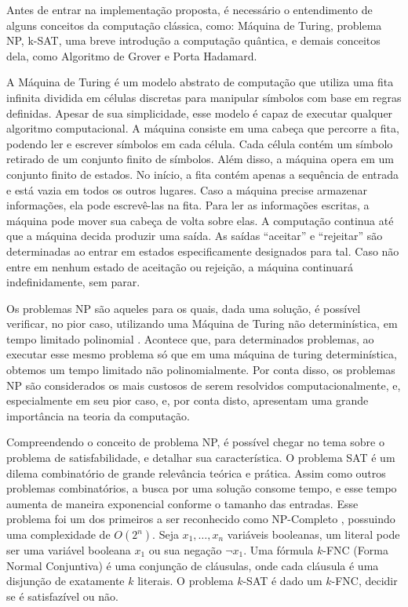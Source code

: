 \documentclass[12pt]{article}
\begin{document}
Antes de entrar na implementação proposta, é necessário o entendimento de alguns conceitos da computação clássica, como: Máquina de Turing, problema NP, k-SAT, uma breve introdução a computação quântica, e demais conceitos dela, como Algoritmo de Grover e Porta Hadamard.

A Máquina de Turing é um modelo abstrato de computação que utiliza uma fita infinita dividida em células discretas para manipular símbolos com base em regras definidas. Apesar de sua simplicidade, esse modelo é capaz de executar qualquer algoritmo computacional. A máquina consiste em uma cabeça que percorre a fita, podendo ler e escrever símbolos em cada célula. Cada célula contém um símbolo retirado de um conjunto finito de símbolos. Além disso, a máquina opera em um conjunto finito de estados. No início, a fita contém apenas a sequência de entrada e está vazia em todos os outros lugares. Caso a máquina precise armazenar informações, ela pode escrevê-las na fita. Para ler as informações escritas, a máquina pode mover sua cabeça de volta sobre elas. A computação continua até que a máquina decida produzir uma saída. As saídas ``aceitar'' e ``rejeitar'' são determinadas ao entrar em estados especificamente designados para tal. Caso não entre em nenhum estado de aceitação ou rejeição, a máquina continuará indefinidamente, sem parar.

Os problemas NP são aqueles para os quais, dada uma solução, é possível verificar, no pior caso,  utilizando uma Máquina de Turing não determinística, em tempo limitado polinomial \cite{sipser:07}. Acontece que, para determinados problemas, ao executar esse mesmo problema só que em uma máquina de turing determinística, obtemos um tempo limitado não polinomialmente. Por conta disso, os problemas NP são considerados os mais custosos de serem resolvidos computacionalmente, e, especialmente em seu pior caso, e, por conta disto, apresentam uma grande importância na teoria da computação.

Compreendendo o conceito de problema NP, é possível chegar no tema sobre o problema de satisfabilidade, e detalhar sua característica. O problema SAT é um dilema combinatório de grande relevância teórica e prática. Assim como outros problemas combinatórios, a busca por uma solução consome tempo, e esse tempo aumenta de maneira exponencial conforme o tamanho das entradas. Esse problema foi um dos primeiros a ser reconhecido como NP-Completo \cite{cook:71}, possuindo uma complexidade de $O(2^n)$. Seja \(x_1, \ldots, x_n\) variáveis booleanas, um literal pode ser uma variável booleana \(x_1\) ou sua negação \(\neg x_1\). Uma fórmula $k$-FNC (Forma Normal Conjuntiva) é uma conjunção de cláusulas, onde cada cláusula é uma disjunção de exatamente $k$ literais. O problema $k$-SAT é dado um $k$-FNC, decidir se é satisfazível ou não.
\end{document}
